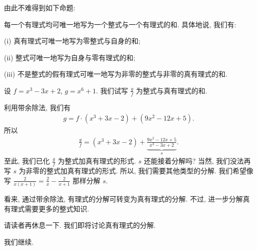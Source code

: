由此不难得到如下命题:
\begin{proposition}
    每一个有理式均可唯一地写为一个整式与一个有理式的和. 具体地说, 我们有:

    (i) 真有理式可唯一地写为零整式与自身的和;

    (ii) 整式可唯一地写为自身与零有理式的和;

    (iii) 不是整式的假有理式可唯一地写为非零的整式与非零的真有理式的和.
\end{proposition}

\begin{example}
    设 $f = x^3 - 3x + 2$, $g = x^6 + 1$. 我们试写 $\frac{g}{f}$ 为整式与真有理式的和.

    利用带余除法, 我们有
    \begin{align*}
        g = f \cdot (x^3 + 3x - 2) + (9x^2 - 12x + 5).
    \end{align*}
    所以
    \begin{align*}
        \frac{g}{f} = (x^3 + 3x - 2) + \underbrace{\frac{9x^2 - 12x + 5}{x^3 - 3x + 2}}_{s}.
    \end{align*}
    至此, 我们已化 $\frac{g}{f}$ 为整式加真有理式的形式. $s$ 还能接着分解吗? 当然, 我们没法再写 $s$ 为非零的整式加真有理式的形式. 所以, 我们需要其他类型的分解. 我们希望像写 $\frac{2}{x(x+1)} = \frac{2}{x} - \frac{2}{x+1}$ 那样分解 $s$.
\end{example}

看来, 通过带余除法, 有理式的分解可转变为真有理式的分解. 不过, 进一步分解真有理式需要更多的整式知识.

请读者再休息一下. 我们即将讨论真有理式的分解.

\myLine

我们继续.

